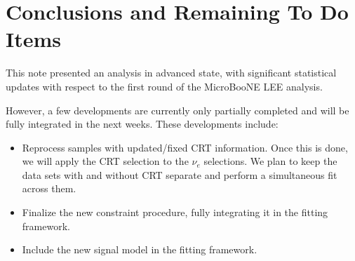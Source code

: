 \section{Conclusions and Remaining To Do Items}
\label{sec:todo}

This note presented an analysis in advanced state, with significant statistical updates with respect to the first round of the MicroBooNE LEE analysis.

However, a few developments are currently only partially completed and will be fully integrated in the next weeks. These developments include:
\begin{itemize}
    \item Reprocess samples with updated/fixed CRT information. Once this is done, we will apply the CRT selection to the $\nu_e$ selections. We plan to keep the data sets with and without CRT separate and perform a simultaneous fit across them.
    \item Finalize the new constraint procedure, fully integrating it in the fitting framework.
    \item Include the new signal model in the fitting framework. 
\end{itemize}